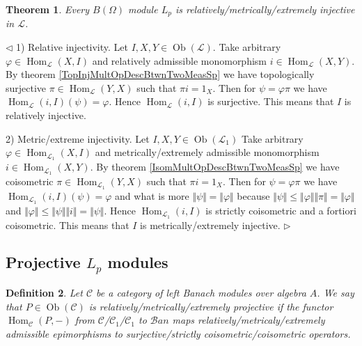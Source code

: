 \documentclass[12pt]{article}
\newtheorem{theorem}{Theorem}[subsection]
\newtheorem{definition}[theorem]{Definition}
\newenvironment{proof}{\par $\triangleleft$}{$\triangleright$}
\begin{document}
\begin{theorem} Every $B(\Omega)$ module $L_p$ is relatively/metrically/extremely injective in $\mathscr{L}$.
\end{theorem}
\begin{proof}
1) Relative injectivity. Let $I,X,Y\in\operatorname{Ob}(\mathscr{L})$. Take arbitrary $\varphi\in\operatorname{Hom}_{\mathscr{L}}(X,I)$ and relatively admissible monomorphism $i\in\operatorname{Hom}_{\mathscr{L}}(X, Y)$. By theorem \ref{TopInjMultOpDescBtwnTwoMeasSp} we have  topologically surjective $\pi\in\operatorname{Hom}_{\mathscr{L}}(Y, X)$ such that $\pi i=1_{X}$. Then for $\psi=\varphi\pi$ we have $\operatorname{Hom}_{\mathscr{L}}(i, I)(\psi)=\varphi$. Hence $\operatorname{Hom}_{\mathscr{L}}(i, I)$ is surjective. This means that $I$ is relatively injective.

2) Metric/extreme injectivity. Let $I,X,Y\in\operatorname{Ob}(\mathscr{L}_1)$ Take arbitrary $\varphi\in\operatorname{Hom}_{\mathscr{L}_1}(X, I)$ and metrically/extremely admissible monomorphism $i\in\operatorname{Hom}_{\mathscr{L}_1}(X, Y)$. By theorem \ref{IsomMultOpDescBtwnTwoMeasSp} we have coisometric $\pi\in\operatorname{Hom}_{\mathscr{L}_1}(Y, X)$ such that $\pi i=1_{X}$. Then for $\psi=\varphi\pi$ we have $\operatorname{Hom}_{\mathscr{L}_1}(i, I)(\psi)=\varphi$ and what is more $\Vert\psi\Vert=\Vert\varphi\Vert$ because $\Vert\psi\Vert\leq\Vert\varphi\Vert\Vert\pi\Vert=\Vert\varphi\Vert$ and $\Vert\varphi\Vert\leq\Vert\psi\Vert\Vert i\Vert=\Vert\psi\Vert$. Hence $\operatorname{Hom}_{\mathscr{L}_1}(i,I)$ is strictly coisometric and a fortiori coisometric. This means that $I$ is metrically/extremely injective.
\end{proof}


















\subsection{Projective \texorpdfstring{$L_p$}{Lp} modules}

\begin{definition} Let $\mathscr{C}$ be a category of left Banach modules over algebra $A$. We say that $P\in\operatorname{Ob}(\mathscr{C})$ is relatively/metrically/extremely projective if the functor $\operatorname{Hom}_{\mathscr{C}}(P,-)$ from $\mathscr{C}$/$\mathscr{C}_1$/$\mathscr{C}_1$ to $\mathscr{B}an$ maps relatively/metricaly/extremely admissible epimorphisms to surjective/strictly coisometric/coisometric operators.
\end{definition}
\end{document}
